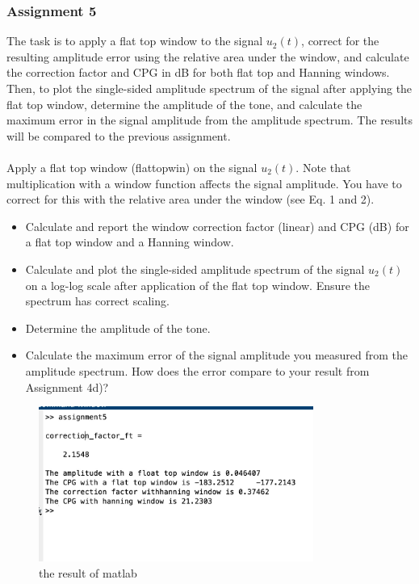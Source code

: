 \documentclass[
	a4paper,
	11pt,
]{article}
\begin{document}
\subsubsection{Assignment 5}
The task is to apply a flat top window to the signal \(u_2(t)\), correct for the resulting amplitude error using the relative area under the window, and calculate the correction factor and CPG in dB for both flat top and Hanning windows. Then, to plot the single-sided amplitude spectrum of the signal after applying the flat top window, determine the amplitude of the tone, and calculate the maximum error in the signal amplitude from the amplitude spectrum. The results will be compared to the previous assignment.\\
\\
Apply a flat top window (flattopwin) on the signal \(u_2 (t)\). Note that multiplication with a window function affects the signal amplitude. You have to correct for this with the relative area under the window (see Eq. 1 and 2).\\

\begin{itemize}
\item Calculate and report the window correction factor (linear) and CPG (dB) for a flat top window and a Hanning window.
\item Calculate and plot the single-sided amplitude spectrum of the signal \(u_2(t)\) on a log-log scale after application of the flat top window. Ensure the spectrum has correct scaling.
\item Determine the amplitude of the tone.
\item Calculate the maximum error of the signal amplitude you measured from the amplitude spectrum. How does the error compare to your result from Assignment 4d)?
\end{itemize}

\begin{figure}[htb!]
    \centerline{\includegraphics[width=9cm]{A5/answer.jpg}}
    \caption{the result of matlab}
\end{figure}
\end{document}
